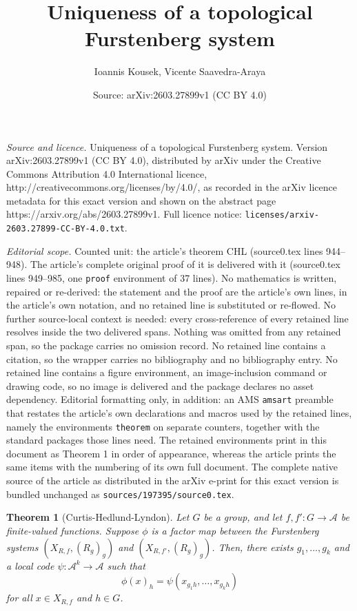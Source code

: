 \documentclass[10pt,a4paper]{amsart}
\title{Uniqueness of a topological Furstenberg system}
\author{Ioannis Kousek, Vicente Saavedra-Araya}
\date{Source: arXiv:2603.27899v1 (CC BY 4.0)}
\newtheorem{theorem}{Theorem}
\begin{document}
\maketitle

\noindent\emph{Source and licence.} Uniqueness of a topological Furstenberg system. Version arXiv:2603.27899v1 (CC BY 4.0), distributed by arXiv under the Creative Commons Attribution 4.0 International licence, http://creativecommons.org/licenses/by/4.0/, as recorded in the arXiv licence metadata for this exact version and shown on the abstract page https://arxiv.org/abs/2603.27899v1. Full licence notice: \texttt{licenses/arxiv-2603.27899-CC-BY-4.0.txt}.\par\smallskip

\noindent\textit{Editorial scope.} Counted unit: the article's theorem CHL (source0.tex lines 944--948). The article's complete original proof of it is delivered with it (source0.tex lines 949--985, one \texttt{proof} environment of 37 lines). No mathematics is written, repaired or re-derived: the statement and the proof are the article's own lines, in the article's own notation, and no retained line is substituted or re-flowed.  No further source-local context is needed: every cross-reference of every retained line resolves inside the two delivered spans.  Nothing was omitted from any retained span, so the package carries no omission record.  No retained line contains a citation, so the wrapper carries no bibliography and no bibliography entry.  No retained line contains a figure environment, an image-inclusion command or drawing code, so no image is delivered and the package declares no asset dependency.  Editorial formatting only, in addition: an AMS \texttt{amsart} preamble that restates the article's own declarations and macros used by the retained lines, namely the environments \texttt{theorem} on separate counters, together with the standard packages those lines need.  The retained environments print in this document as Theorem 1 in order of appearance, whereas the article prints the same items with the numbering of its own full document.  The complete native source of the article as distributed in the arXiv e-print for this exact version is bundled unchanged as \texttt{sources/197395/source0.tex}.
\begin{theorem}[Curtis-Hedlund-Lyndon]\label{CHL}
Let $G$ be a group, and let $f,f':G\to \mathcal{A}$ be finite-valued functions. Suppose $\phi$ is a factor map between the Furstenberg systems $(X_{R,f},(R_g)_g)$ and $(X_{R,f'},(R_g)_g)$. Then, there exists $g_1,\dots,g_k$ and a local code $\psi:\mathcal{A}^k\to \mathcal{A}$ such that
$$\phi(x)_h=\psi(x_{g_1h},\dots,x_{g_kh})$$
for all $x\in X_{R,f}$ and $h\in G$.
\end{theorem}
\end{document}
